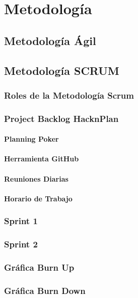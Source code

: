 \chapter{Metodología}

\section{Metodología Ágil}

\section{Metodología SCRUM}

\subsection{Roles de la Metodología Scrum}

\subsection{Project Backlog HacknPlan}

\subsubsection{Planning Poker}

\subsubsection{Herramienta GitHub}

\subsubsection{Reuniones Diarias}

\subsubsection{Horario de Trabajo}

\subsection{Sprint 1}

\subsection{Sprint 2}

\subsection{Gráfica Burn Up}

\subsection{Gráfica Burn Down}
